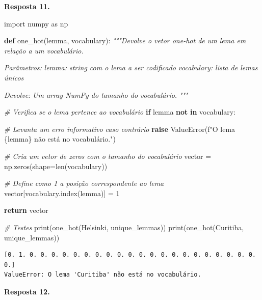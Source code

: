 \documentclass[
  brazilian,
]{article}
\newenvironment{Shaded}{}{}
\newcommand{\BuiltInTok}[1]{#1}
\newcommand{\CommentTok}[1]{\textcolor[rgb]{0.38,0.63,0.69}{\textit{#1}}}
\newcommand{\ControlFlowTok}[1]{\textcolor[rgb]{0.00,0.44,0.13}{\textbf{#1}}}
\newcommand{\DecValTok}[1]{\textcolor[rgb]{0.25,0.63,0.44}{#1}}
\newcommand{\ImportTok}[1]{#1}
\newcommand{\KeywordTok}[1]{\textcolor[rgb]{0.00,0.44,0.13}{\textbf{#1}}}
\newcommand{\NormalTok}[1]{#1}
\newcommand{\OperatorTok}[1]{\textcolor[rgb]{0.40,0.40,0.40}{#1}}
\newcommand{\PreprocessorTok}[1]{\textcolor[rgb]{0.74,0.48,0.00}{#1}}
\newcommand{\SpecialCharTok}[1]{\textcolor[rgb]{0.25,0.44,0.63}{#1}}
\newcommand{\SpecialStringTok}[1]{\textcolor[rgb]{0.73,0.40,0.53}{#1}}
\newcommand{\StringTok}[1]{\textcolor[rgb]{0.25,0.44,0.63}{#1}}
\begin{document}
\textbf{Resposta 11.}

\begin{Shaded}
\begin{Highlighting}[]
\ImportTok{import}\NormalTok{ numpy }\ImportTok{as}\NormalTok{ np}

\KeywordTok{def}\NormalTok{ one\_hot(lemma, vocabulary):}
    \CommentTok{"""Devolve o vetor one{-}hot de um lema em relação a um vocabulário.}

\CommentTok{    Parâmetros:}
\CommentTok{        lemma: string com o lema a ser codificado}
\CommentTok{        vocabulary: lista de lemas únicos}

\CommentTok{    Devolve:}
\CommentTok{        Um array NumPy do tamanho do vocabulário.}
\CommentTok{    """}

    \CommentTok{\# Verifica se o lema pertence ao vocabulário}
    \ControlFlowTok{if}\NormalTok{ lemma }\KeywordTok{not} \KeywordTok{in}\NormalTok{ vocabulary:}

        \CommentTok{\# Levanta um erro informativo caso contrário}
        \ControlFlowTok{raise} \PreprocessorTok{ValueError}\NormalTok{(}\SpecialStringTok{f"O lema \textquotesingle{}}\SpecialCharTok{\{}\NormalTok{lemma}\SpecialCharTok{\}}\SpecialStringTok{\textquotesingle{} não está no vocabulário."}\NormalTok{)}

    \CommentTok{\# Cria um vetor de zeros com o tamanho do vocabulário}
\NormalTok{    vector }\OperatorTok{=}\NormalTok{ np.zeros(shape}\OperatorTok{=}\BuiltInTok{len}\NormalTok{(vocabulary))}

    \CommentTok{\# Define como 1 a posição correspondente ao lema}
\NormalTok{    vector[vocabulary.index(lemma)] }\OperatorTok{=} \DecValTok{1}

    \ControlFlowTok{return}\NormalTok{ vector}


\CommentTok{\# Testes}
\BuiltInTok{print}\NormalTok{(one\_hot(}\StringTok{\textquotesingle{}Helsinki\textquotesingle{}}\NormalTok{, unique\_lemmas))}
\BuiltInTok{print}\NormalTok{(one\_hot(}\StringTok{\textquotesingle{}Curitiba\textquotesingle{}}\NormalTok{, unique\_lemmas))}
\end{Highlighting}
\end{Shaded}

\begin{verbatim}
[0. 1. 0. 0. 0. 0. 0. 0. 0. 0. 0. 0. 0. 0. 0. 0. 0. 0. 0. 0. 0. 0. 0. 0.]
ValueError: O lema 'Curitiba' não está no vocabulário.
\end{verbatim}

\textbf{Resposta 12.}
\end{document}
